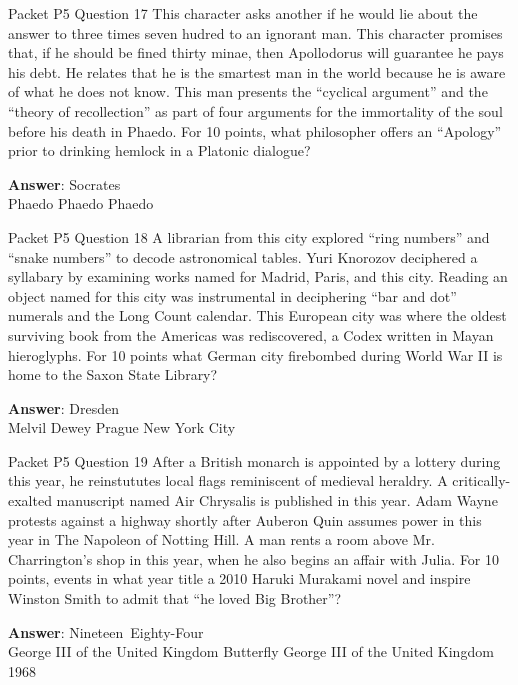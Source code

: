 \begin{frame}{Packet P5 Question 17}
This character asks another if he would lie about the answer to three times seven hudred to an ignorant man. This character promises that, if he should be fined thirty minae, then Apollodorus will guarantee he pays his debt. He relates that he is the smartest man in the world because he is aware of what   he does not know. This man presents the ``cyclical argument'' and the ``theory of recollection'' as part of four arguments for the immortality   of the soul before   his death in Phaedo. For 10 points, what   philosopher offers an ``Apology'' prior   to drinking hemlock in a Platonic dialogue?  

\textbf{Answer}: Socrates\\
 Phaedo
 Phaedo
 Phaedo
\end{frame}

\begin{frame}{Packet P5 Question 18}
A librarian from this   city explored “ring numbers” and “snake numbers” to decode astronomical tables. Yuri Knorozov deciphered a syllabary by examining works named for Madrid, Paris, and this city. Reading an object named for this city was instrumental in deciphering “bar and dot” numerals and the Long Count calendar. This European city was where the oldest surviving book from the Americas was rediscovered, a Codex written in Mayan hieroglyphs. For 10 points what German city firebombed during World   War II is home to   the Saxon State Library?    

\textbf{Answer}: Dresden\\
 Melvil Dewey
 Prague
 New York City
\end{frame}

\begin{frame}{Packet P5 Question 19}
After a British monarch is appointed by a   lottery during this year, he reinstututes local flags reminiscent of medieval heraldry. A critically-exalted manuscript named Air Chrysalis is published in this   year. Adam Wayne protests against a highway shortly after Auberon Quin assumes power in this year in The Napoleon of Notting Hill. A man rents a room above Mr. Charrington's shop   in this year, when he also begins an affair with Julia. For 10 points, events in what year title a 2010 Haruki Murakami novel and inspire Winston Smith to admit that “he loved Big   Brother”?    

\textbf{Answer}: Nineteen\ Eighty-Four\\
 George III of the United Kingdom
 Butterfly
 George III of the United Kingdom
 1968
\end{frame}

